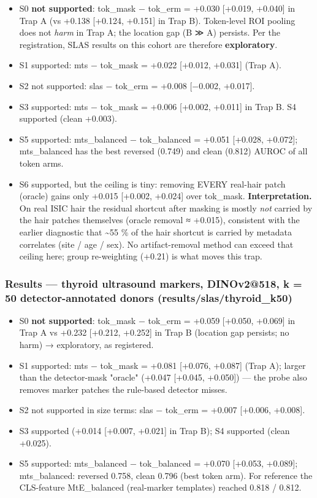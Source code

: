 {\begin{itemize}
\item
  S0 \textbf{not supported}: tok\_mask − tok\_erm = +0.030 {[}+0.019, +0.040{]} in Trap A (vs +0.138 {[}+0.124, +0.151{]} in
  Trap B). Token-level ROI pooling does not \emph{harm} in Trap A; the location gap (B ≫ A) persists.
  Per the registration, SLAS results on this cohort are therefore \textbf{exploratory}.
\item
  S1 supported: mts − tok\_mask = +0.022 {[}+0.012, +0.031{]} (Trap A).
\item
  S2 not supported: slas − tok\_erm = +0.008 {[}−0.002, +0.017{]}.
\item
  S3 supported: mts − tok\_mask = +0.006 {[}+0.002, +0.011{]} in Trap B. S4 supported (clean +0.003).
\item
  S5 supported: mts\_balanced − tok\_balanced = +0.051 {[}+0.028, +0.072{]}; mts\_balanced has the best reversed
  (0.749) and clean (0.812) AUROC of all token arms.
\item
  S6 supported, but the ceiling is tiny: removing EVERY real-hair patch (oracle) gains only
  +0.015 {[}+0.002, +0.024{]} over tok\_mask.
  \textbf{Interpretation.} On real ISIC hair the residual shortcut after masking is mostly \emph{not} carried by the hair
  patches themselves (oracle removal ≈ +0.015), consistent with the earlier diagnostic that \textasciitilde55 \% of the hair
  shortcut is carried by metadata correlates (site / age / sex). No artifact-removal method can exceed that
  ceiling here; group re-weighting (+0.21) is what moves this trap.
\end{itemize}

\subsubsection{Results --- thyroid ultrasound markers, DINOv2@518, k = 50 detector-annotated donors (results/slas/thyroid\_k50)}\label{results--thyroid-ultrasound-markers-dinov2518-k--50-detector-annotated-donors-resultsslasthyroid_k50}

\begin{itemize}

\item
  S0 \textbf{not supported}: tok\_mask − tok\_erm = +0.059 {[}+0.050, +0.069{]} in Trap A vs +0.232 {[}+0.212, +0.252{]} in
  Trap B (location gap persists; no harm) → exploratory, as registered.
\item
  S1 supported: mts − tok\_mask = +0.081 {[}+0.076, +0.087{]} (Trap A); larger than the detector-mask "oracle"
  (+0.047 {[}+0.045, +0.050{]}) --- the probe also removes marker patches the rule-based detector misses.
\item
  S2 not supported in size terms: slas − tok\_erm = +0.007 {[}+0.006, +0.008{]}.
\item
  S3 supported (+0.014 {[}+0.007, +0.021{]} in Trap B); S4 supported (clean +0.025).
\item
  S5 supported: mts\_balanced − tok\_balanced = +0.070 {[}+0.053, +0.089{]}; mts\_balanced: reversed 0.758, clean 0.796
  (best token arm). For reference the CLS-feature MtE\_balanced (real-marker templates) reached 0.818 / 0.812.
\end{itemize}

}


